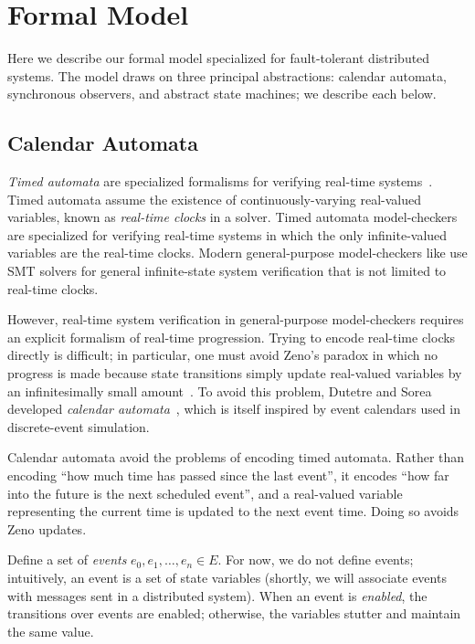 \documentclass{llncs/llncs}
\newcommand{\lee}[1]{ } %
\newcommand{\lee}[1]{ {\color{blue}$<$lee: #1$>$} } %
\begin{document}


\section{Formal Model}\label{sec:model}
Here we describe our formal model specialized for fault-tolerant distributed systems. The model draws on three principal abstractions: calendar automata, synchronous observers, and abstract state machines; we describe each below.

\subsection{Calendar Automata}\label{sec:calendar}
\emph{Timed automata} are specialized formalisms for verifying real-time systems~\cite{}. Timed automata assume the existence of continuously-varying real-valued variables, known as \emph{real-time clocks} in a solver. Timed automata model-checkers are specialized for verifying real-time systems in which the only infinite-valued variables are the real-time clocks. Modern general-purpose model-checkers like \lee{name some} use SMT solvers for general infinite-state system verification that is not limited to real-time clocks.

However, real-time system verification in general-purpose model-checkers requires an explicit formalism of real-time progression. Trying to encode real-time clocks directly is difficult; in particular, one must avoid Zeno's paradox in which no progress is made because state transitions simply update real-valued variables by an infinitesimally small amount~\cite{bruno,lamport}. To avoid this problem, Dutetre and Sorea developed \emph{calendar automata}~\cite{bruno}, which is itself inspired by event calendars used in discrete-event simulation.

Calendar automata avoid the problems of encoding timed automata. Rather than encoding ``how much time has passed since the last event'', it encodes ``how far into the future is the next scheduled event'', and a real-valued variable representing the current time is updated to the next event time. Doing so avoids Zeno updates.

Define a set of \emph{events} $e_0, e_1, \ldots, e_n \in E$. For now, we do not define events; intuitively, an event is a set of state variables (shortly, we will associate events with messages sent in a distributed system). When an event is \emph{enabled}, the transitions over events are enabled; otherwise, the variables stutter and maintain the same value.
\end{document}
